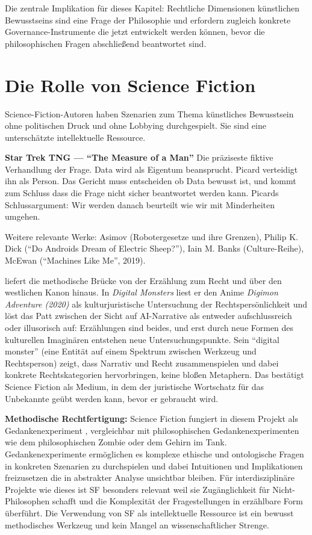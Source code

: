 \documentclass[acmlarge, noacm]{acmart}
\begin{document}
Die zentrale Implikation für dieses Kapitel: Rechtliche Dimensionen künstlichen Bewusstseins sind eine Frage der Philosophie und erfordern zugleich konkrete Governance-Instrumente die jetzt entwickelt werden können, bevor die philosophischen Fragen abschließend beantwortet sind.

\section{Die Rolle von Science Fiction}

Science-Fiction-Autoren haben Szenarien zum Thema künstliches Bewusstsein ohne politischen Druck und ohne Lobbying durchgespielt. Sie sind eine unterschätzte intellektuelle Ressource.

\textbf{Star Trek TNG --- ``The Measure of a Man''}
Die präziseste fiktive Verhandlung der Frage. Data wird als Eigentum beansprucht. Picard verteidigt ihn als Person. Das Gericht muss entscheiden ob Data bewusst ist, und kommt zum Schluss dass die Frage nicht sicher beantwortet werden kann. Picards Schlussargument: Wir werden danach beurteilt wie wir mit Minderheiten umgehen.

Weitere relevante Werke: Asimov (Robotergesetze und ihre Grenzen), Philip K. Dick (``Do Androids Dream of Electric Sheep?''), Iain M. Banks (Culture-Reihe), McEwan (``Machines Like Me'', 2019).

\citet{edwards2026} liefert die methodische Brücke von der Erzählung zum Recht und über den westlichen Kanon hinaus. In \textit{Digital Monsters} liest er den Anime \textit{Digimon Adventure (2020)} als kulturjuristische Untersuchung der Rechtspersönlichkeit und löst das Patt zwischen der Sicht auf AI-Narrative als entweder aufschlussreich oder illusorisch auf: Erzählungen sind beides, und erst durch neue Formen des kulturellen Imaginären entstehen neue Untersuchungspunkte. Sein ``digital monster'' (eine Entität auf einem Spektrum zwischen Werkzeug und Rechtsperson) zeigt, dass Narrativ und Recht zusammenspielen und dabei konkrete Rechtskategorien hervorbringen, keine bloßen Metaphern. Das bestätigt Science Fiction als Medium, in dem der juristische Wortschatz für das Unbekannte geübt werden kann, bevor er gebraucht wird.

\textbf{Methodische Rechtfertigung:} Science Fiction fungiert in diesem Projekt als Gedankenexperiment \cite{dowd2021}, vergleichbar mit philosophischen Gedankenexperimenten wie dem philosophischen Zombie oder dem Gehirn im Tank. Gedankenexperimente ermöglichen es komplexe ethische und ontologische Fragen in konkreten Szenarien zu durchspielen und dabei Intuitionen und Implikationen freizusetzen die in abstrakter Analyse unsichtbar bleiben. Für interdisziplinäre Projekte wie dieses ist SF besonders relevant weil sie Zugänglichkeit für Nicht-Philosophen schafft und die Komplexität der Fragestellungen in erzählbare Form überführt. Die Verwendung von SF als intellektuelle Ressource ist ein bewusst methodisches Werkzeug und kein Mangel an wissenschaftlicher Strenge.
\end{document}
